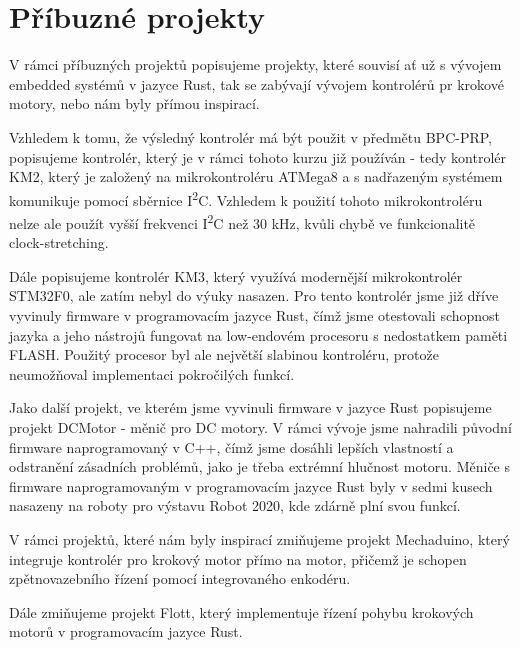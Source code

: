 \section*{Příbuzné projekty}
V rámci příbuzných projektů popisujeme projekty, které souvisí ať už s vývojem embedded systémů v jazyce Rust, tak se zabývají vývojem kontrolérů pr krokové motory, nebo nám byly přímou inspirací.

Vzhledem k tomu, že výsledný kontrolér má být použit v předmětu BPC-PRP, popisujeme kontrolér, který je v rámci tohoto kurzu již používán - tedy kontrolér KM2, který je založený na mikrokontroléru ATMega8 a s nadřazeným systémem komunikuje pomocí sběrnice I\textsuperscript{2}C.
Vzhledem k použití tohoto mikrokontroléru nelze ale použít vyšší frekvenci I\textsuperscript{2}C než 30 kHz, kvůli chybě ve funkcionalitě clock-stretching.

Dále popisujeme kontrolér KM3, který využívá modernější mikrokontrolér STM32F0, ale zatím nebyl do výuky nasazen.
Pro tento kontrolér jsme již dříve vyvinuly firmware v programovacím jazyce Rust, čímž jsme otestovali schopnost jazyka a jeho nástrojů fungovat na low-endovém procesoru s nedostatkem paměti FLASH.
Použitý procesor byl ale největší slabinou kontroléru, protože neumožňoval implementaci pokročilých funkcí.

Jako další projekt, ve kterém jsme vyvinuli firmware v jazyce Rust popisujeme projekt DCMotor - měnič pro DC motory.
V rámci vývoje jsme nahradili původní firmware naprogramovaný v C++, čímž jsme dosáhli lepších vlastností a odstranění zásadních problémů, jako je třeba extrémní hlučnost motoru.
Měniče s firmware naprogramovaným v programovacím jazyce Rust byly v sedmi kusech nasazeny na roboty pro výstavu Robot 2020, kde zdárně plní svou funkcí.

V rámci projektů, které nám byly inspirací zmiňujeme projekt Mechaduino, který integruje kontrolér pro krokový motor přímo na motor, přičemž je schopen zpětnovazebního řízení pomocí integrovaného enkodéru.

Dále zmiňujeme projekt Flott, který implementuje řízení pohybu krokových motorů v programovacím jazyce Rust.


